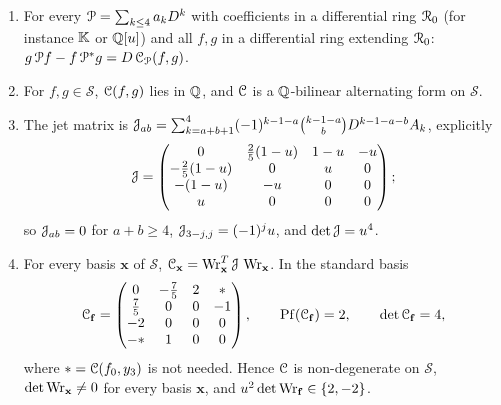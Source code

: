 \begin{lem}
\label{lem:gau-conc}
\begin{enumerate}
\item For every $\mathcal{P}=\sum_{k\leq4}a_kD^k$ with coefficients in a differential ring $\mathcal{R}_0$ (for instance $\mathbb{K}$ or $\mathbb{Q}[u]$) and all $f,g$ in a differential ring extending $\mathcal{R}_0$: $g\,\mathcal{P} f-f\,\mathcal{P}^*g=D\,\mathcal{C}_{\mathcal{P}}(f,g)$.
\item For $f,g\in\mathcal S$, $\mathcal{C}(f,g)$ lies in $\mathbb{Q}$, and $\mathcal{C}$ is a $\mathbb{Q}$-bilinear alternating form on $\mathcal S$.
\item The jet matrix is $\mathcal{J}_{ab}=\sum_{k=a+b+1}^4(-1)^{k-1-a}\binom{k-1-a}{b}D^{k-1-a-b}A_k$, explicitly
\[
\mathcal{J}=\begin{pmatrix}0&\frac25(1-u)&1-u&-u\\-\frac25(1-u)&0&u&0\\-(1-u)&-u&0&0\\u&0&0&0\end{pmatrix};
\]
so $\mathcal{J}_{ab}=0$ for $a+b\geq4$, $\mathcal{J}_{3-j,j}=(-1)^ju$, and $\det\mathcal{J}=u^4$.
\item For every basis $\mathbf x$ of $\mathcal S$, $\mathcal{C}_{\mathbf x}=\operatorname{Wr}_{\mathbf x}^T\mathcal{J}\,\operatorname{Wr}_{\mathbf x}$. In the standard basis
\[
\mathcal{C}_{\mathbf f}=\begin{pmatrix}0&-\frac75&2&\ast\\\frac75&0&0&-1\\-2&0&0&0\\-\ast&1&0&0\end{pmatrix},\qquad \operatorname{Pf}(\mathcal{C}_{\mathbf f})=2,\qquad\det\mathcal{C}_{\mathbf f}=4,
\]
where $\ast=\mathcal{C}(f_0,y_3)$ is not needed. Hence $\mathcal{C}$ is non-degenerate on $\mathcal S$, $\det\operatorname{Wr}_{\mathbf x}\neq0$ for every basis $\mathbf x$, and $u^2\det\operatorname{Wr}_{\mathbf f}\in\{2,-2\}$.
\end{enumerate}
\end{lem}

